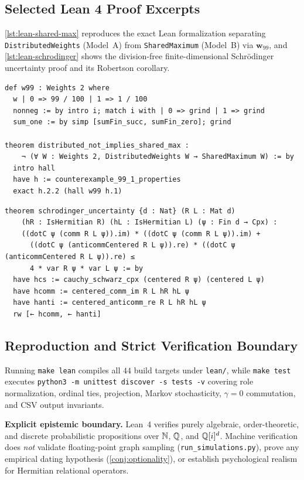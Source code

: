 \subsection{Selected Lean 4 Proof Excerpts}
\label{subsec:ver-excerpts}

\cref{lst:lean-shared-max} reproduces the exact Lean formalization separating
\texttt{DistributedWeights} (Model~A) from \texttt{SharedMaximum} (Model~B) via $\mathbf{w}_{99}$,
and \cref{lst:lean-schrodinger} shows the division-free finite-dimensional Schr\"odinger
uncertainty proof and its Robertson corollary.

\begin{lstlisting}[language=Lean4,caption={Model A vs.\ Model B separation in Lean~4 (\texttt{SharedMaximum.lean}).},label={lst:lean-shared-max}]
def w99 : Weights 2 where
  w | 0 => 99 / 100 | 1 => 1 / 100
  nonneg := by intro i; match i with | 0 => grind | 1 => grind
  sum_one := by simp [sumFin_succ, sumFin_zero]; grind

theorem distributed_not_implies_shared_max :
    ¬ (∀ W : Weights 2, DistributedWeights W → SharedMaximum W) := by
  intro hall
  have h := counterexample_99_1_properties
  exact h.2.2 (hall w99 h.1)
\end{lstlisting}

\begin{lstlisting}[language=Lean4,caption={Schr\"odinger and Robertson inequalities in Lean~4 (\texttt{Robertson.lean}).},label={lst:lean-schrodinger}]
theorem schrodinger_uncertainty {d : Nat} (R L : Mat d)
    (hR : IsHermitian R) (hL : IsHermitian L) (ψ : Fin d → Cpx) :
    ((dotC ψ (comm R L ψ)).im) * ((dotC ψ (comm R L ψ)).im) +
      ((dotC ψ (anticommCentered R L ψ)).re) * ((dotC ψ (anticommCentered R L ψ)).re) ≤
      4 * var R ψ * var L ψ := by
  have hcs := cauchy_schwarz_cpx (centered R ψ) (centered L ψ)
  have hcomm := centered_comm_im R L hR hL ψ
  have hanti := centered_anticomm_re R L hR hL ψ
  rw [← hcomm, ← hanti]
\end{lstlisting}

\subsection{Reproduction and Strict Verification Boundary}
\label{subsec:ver-scope}

Running \texttt{make lean} compiles all $44$ build targets under \texttt{lean/}, while
\texttt{make test} executes \texttt{python3 -m unittest discover -s tests -v} covering
role normalization, ordinal ties, projection, Markov stochasticity, $\gamma=0$ commutation,
and CSV output invariants.

\noindent\textbf{Explicit epistemic boundary.} Lean~4 verifies purely algebraic, order-theoretic,
and discrete probabilistic propositions over $\mathbb{N}$, $\mathbb{Q}$, and $\mathbb{Q}[i]^d$. Machine
verification does \emph{not} validate floating-point graph sampling (\texttt{run\_simulations.py}),
prove any empirical dating hypothesis (\cref{conj:optionality}), or establish psychological
realism for Hermitian relational operators.
